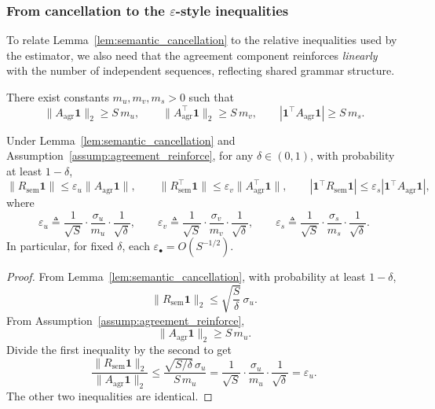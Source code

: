 \subsubsection{From cancellation to the $\varepsilon$-style inequalities}

To relate Lemma~\ref{lem:semantic_cancellation} to the relative inequalities used by the estimator,
we also need that the agreement component reinforces \emph{linearly} with the number of independent
sequences, reflecting shared grammar structure.

\begin{assumption}
\label{assump:agreement_reinforce}
There exist constants $m_u,m_v,m_s>0$ such that
\begin{equation}
\label{eq:agreement_linear_scaling}
\|A_{\mathrm{agr}}\mathbf{1}\|_2 \ge S\,m_u,\qquad
\|A_{\mathrm{agr}}^\top\mathbf{1}\|_2 \ge S\,m_v,\qquad
|\mathbf{1}^\top A_{\mathrm{agr}}\mathbf{1}| \ge S\,m_s.
\end{equation}
\end{assumption}

\begin{corollary}
\label{cor:eps_condition}
Under Lemma~\ref{lem:semantic_cancellation} and Assumption~\ref{assump:agreement_reinforce},
for any $\delta\in(0,1)$, with probability at least $1-\delta$,
\begin{equation}
\label{eq:residual_cancel}
\|R_{\mathrm{sem}}\mathbf{1}\|
\le
\varepsilon_u \|A_{\mathrm{agr}}\mathbf{1}\|,
\qquad
\|R_{\mathrm{sem}}^\top\mathbf{1}\|
\le
\varepsilon_v \|A_{\mathrm{agr}}^\top\mathbf{1}\|,
\qquad
|\mathbf{1}^\top R_{\mathrm{sem}}\mathbf{1}|
\le
\varepsilon_s |\mathbf{1}^\top A_{\mathrm{agr}}\mathbf{1}|,
\end{equation}
where
\[
\varepsilon_u \triangleq \frac{1}{\sqrt{S}}\cdot \frac{\sigma_u}{m_u}\cdot\frac{1}{\sqrt{\delta}},
\qquad
\varepsilon_v \triangleq \frac{1}{\sqrt{S}}\cdot \frac{\sigma_v}{m_v}\cdot\frac{1}{\sqrt{\delta}},
\qquad
\varepsilon_s \triangleq \frac{1}{\sqrt{S}}\cdot \frac{\sigma_s}{m_s}\cdot\frac{1}{\sqrt{\delta}}.
\]
In particular, for fixed $\delta$, each $\varepsilon_\bullet = O(S^{-1/2})$.
\end{corollary}

\begin{proof}
From Lemma~\ref{lem:semantic_cancellation}, with probability at least $1-\delta$,
\[
\|R_{\mathrm{sem}}\mathbf{1}\|_2 \le \sqrt{\frac{S}{\delta}}\,\sigma_u.
\]
From Assumption~\ref{assump:agreement_reinforce},
\[
\|A_{\mathrm{agr}}\mathbf{1}\|_2 \ge S\,m_u.
\]
Divide the first inequality by the second to get
\[
\frac{\|R_{\mathrm{sem}}\mathbf{1}\|_2}{\|A_{\mathrm{agr}}\mathbf{1}\|_2}
\le
\frac{\sqrt{S/\delta}\,\sigma_u}{S\,m_u}
=
\frac{1}{\sqrt{S}}\cdot\frac{\sigma_u}{m_u}\cdot\frac{1}{\sqrt{\delta}}
=
\varepsilon_u.
\]
The other two inequalities are identical.
\end{proof}

